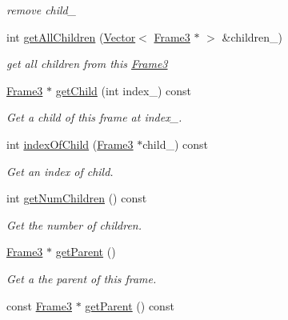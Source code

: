 \begin{DoxyCompactItemize}
\begin{DoxyCompactList}\small\item\em remove child\+\_\+ \end{DoxyCompactList}\item 
int \hyperlink{class_i_dream_sky_1_1_frame3_a337b8663b91864fc671a2ffadb6ffad1}{get\+All\+Children} (\hyperlink{class_i_dream_sky_1_1_vector}{Vector}$<$ \hyperlink{class_i_dream_sky_1_1_frame3}{Frame3} $\ast$ $>$ \&children\+\_\+)\hypertarget{class_i_dream_sky_1_1_frame3_a337b8663b91864fc671a2ffadb6ffad1}{}\label{class_i_dream_sky_1_1_frame3_a337b8663b91864fc671a2ffadb6ffad1}

\begin{DoxyCompactList}\small\item\em get all children from this \hyperlink{class_i_dream_sky_1_1_frame3}{Frame3} \end{DoxyCompactList}\item 
\hyperlink{class_i_dream_sky_1_1_frame3}{Frame3} $\ast$ \hyperlink{class_i_dream_sky_1_1_frame3_a2bf739f149f6dd645358f2c74aa95aee}{get\+Child} (int index\+\_\+) const 
\begin{DoxyCompactList}\small\item\em Get a child of this frame at index\+\_\+. \end{DoxyCompactList}\item 
int \hyperlink{class_i_dream_sky_1_1_frame3_aa72ca808937dd7f99e96dfd6076c6ec3}{index\+Of\+Child} (\hyperlink{class_i_dream_sky_1_1_frame3}{Frame3} $\ast$child\+\_\+) const 
\begin{DoxyCompactList}\small\item\em Get an index of child. \end{DoxyCompactList}\item 
int \hyperlink{class_i_dream_sky_1_1_frame3_a0223522857c808e4a416a1ff07e1380f}{get\+Num\+Children} () const 
\begin{DoxyCompactList}\small\item\em Get the number of children. \end{DoxyCompactList}\item 
\hyperlink{class_i_dream_sky_1_1_frame3}{Frame3} $\ast$ \hyperlink{class_i_dream_sky_1_1_frame3_a08c5e5cb5e2127e9c8a166005abda231}{get\+Parent} ()
\begin{DoxyCompactList}\small\item\em Get a the parent of this frame. \end{DoxyCompactList}\item 
const \hyperlink{class_i_dream_sky_1_1_frame3}{Frame3} $\ast$ \hyperlink{class_i_dream_sky_1_1_frame3_af88c07c4e894af72f64252b2c71d9483}{get\+Parent} () const 

\end{DoxyCompactItemize}
